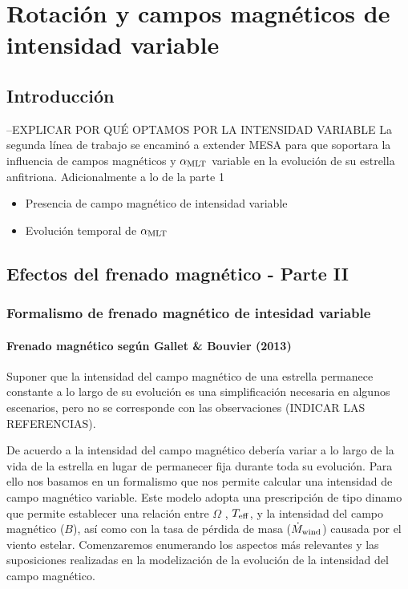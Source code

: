 
\chapter{Rotación y campos magnéticos de intensidad variable}\label{ch:sexto-capitulo}

\section{Introducción}
--EXPLICAR POR QUÉ OPTAMOS POR LA INTENSIDAD VARIABLE
La segunda línea de trabajo se encaminó a extender MESA para que soportara la influencia de campos magnéticos y $\alpha_{\mathrm{MLT}}$ variable en la evolución de su estrella anfitriona.
Adicionalmente a lo de la parte 1
\begin{itemize}
	\item Presencia de campo magnético de intensidad variable
	\item Evolución temporal de $\alpha_{\mathrm{MLT}}$
\end{itemize}
\section{Efectos del frenado magnético - Parte II}

\subsection{Formalismo de frenado magnético de intesidad variable} 

\subsubsection{Frenado magnético según Gallet \& Bouvier (2013)}
Suponer que la intensidad del campo magnético de una estrella permanece constante a lo largo de su evolución es una simplificación necesaria en algunos escenarios, pero no se corresponde con las observaciones (INDICAR LAS REFERENCIAS). \par

De acuerdo a \cite{Gallet2013} la intensidad del campo magnético debería variar a lo largo de la vida de la estrella en lugar de permanecer fija durante toda su evolución. Para ello nos basamos en un formalismo que nos permite calcular una intensidad de campo magnético variable. Este modelo adopta una prescripción de tipo dinamo que permite establecer una relación entre $\Omega$ , $T_{\mathrm{eff}}$, y la intensidad del campo magnético ($B$), así como con la tasa de pérdida de masa ($\Dot{M}_{\mathrm{wind}}$) causada por el viento estelar. Comenzaremos enumerando los aspectos más relevantes y las suposiciones realizadas en la modelización de la evolución de la intensidad del campo magnético.\par 

